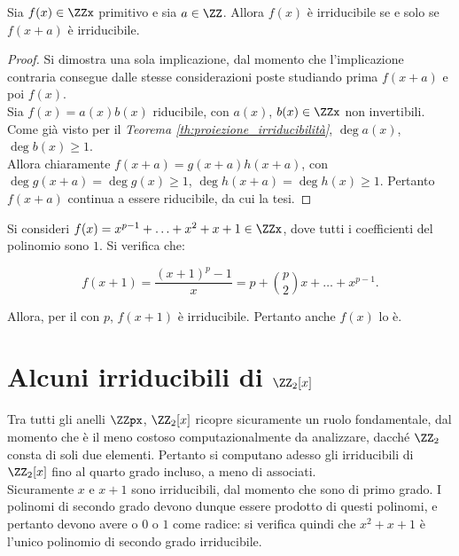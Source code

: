 \begin{theorem}
    Sia $f(x) \in \ZZx$ primitivo e sia $a \in \ZZ$. Allora $f(x)$ è
    irriducibile se e solo se $f(x+a)$ è irriducibile.
\end{theorem}

\begin{proof}
    Si dimostra una sola implicazione, dal momento che l'implicazione
    contraria consegue dalle stesse considerazioni poste
    studiando prima $f(x+a)$ e poi $f(x)$. \\

    Sia $f(x)=a(x)b(x)$ riducibile, con $a(x)$, $b(x) \in \ZZx$ non
    invertibili. Come già visto per il \textit{Teorema
        \ref{th:proiezione_irriducibilità}}, $\deg a(x)$, $\deg b(x) \geq 1$. \\

    Allora chiaramente $f(x+a)=g(x+a)h(x+a)$, con $\deg g(x+a) =
        \deg g(x) \geq 1$, $\deg h(x+a) = \deg h(x) \geq 1$. Pertanto
    $f(x+a)$ continua a essere riducibile, da cui la tesi.
\end{proof}

\begin{example}
    Si consideri $f(x) = x^{p-1}+\ldots+x^2+x+1 \in \ZZx$, dove
    tutti i coefficienti del polinomio sono $1$. Si verifica che:

    \[ f(x+1)=\frac{(x+1)^p-1}x = p+\binom{p}{2}x+\ldots+x^{p-1}. \]

    Allora, per il  con $p$, $f(x+1)$ è
    irriducibile. Pertanto anche $f(x)$ lo è.
\end{example}

\section{Alcuni irriducibili di \texorpdfstring{$\ZZ_2[x]$}{Z\_2[x]}}

Tra tutti gli anelli $\ZZpx$, $\ZZ_2[x]$ ricopre sicuramente
un ruolo fondamentale, dal momento che è il meno costoso
computazionalmente da analizzare, dacché $\ZZ_2$ consta
di soli due elementi. Pertanto si computano adesso gli
irriducibili di $\ZZ_2[x]$ fino al quarto grado incluso, a meno
di associati. \\

Sicuramente $x$ e $x+1$ sono irriducibili, dal momento che sono di
primo grado. I polinomi di secondo grado devono dunque essere
prodotto di questi polinomi, e pertanto devono avere o $0$ o
$1$ come radice: si verifica quindi che $x^2+x+1$ è l'unico
polinomio di secondo grado irriducibile. \\

